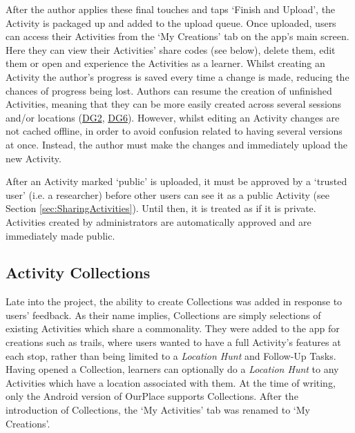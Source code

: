 After the author applies these final touches and taps `Finish and Upload', the Activity is packaged up and added to the upload queue. Once uploaded, users can access their Activities from the ‘My Creations’ tab on the app's main screen. Here they can view their Activities' share codes (see below), delete them, edit them or open and experience the Activities as a learner. Whilst creating an Activity the author's progress is saved every time a change is made, reducing the chances of progress being lost. Authors can resume the creation of unfinished Activities, meaning that they can be more easily created across several sessions and/or locations (\hyperref[DG2]{DG2}, \hyperref[DG6]{DG6}). However, whilst editing an Activity changes are not cached offline, in order to avoid confusion related to having several versions at once. Instead, the author must make the changes and immediately upload the new Activity.

After an Activity marked `public' is uploaded, it must be approved by a `trusted user' (i.e. a researcher) before other users can see it as a public Activity (see Section \ref{sec:SharingActivities}). Until then, it is treated as if it is private. Activities created by administrators are automatically approved and are immediately made public.

\subsection{Activity Collections}
Late into the project, the ability to create Collections was added in response to users' feedback. As their name implies, Collections are simply selections of existing Activities which share a commonality. They were added to the app for creations such as trails, where users wanted to have a full Activity's features at each stop, rather than being limited to a \textit{Location Hunt} and Follow-Up Tasks. Having opened a Collection, learners can optionally do a \textit{Location Hunt} to any Activities which have a location associated with them. At the time of writing, only the Android version of OurPlace supports Collections. After the introduction of Collections, the `My Activities' tab was renamed to `My Creations'.

